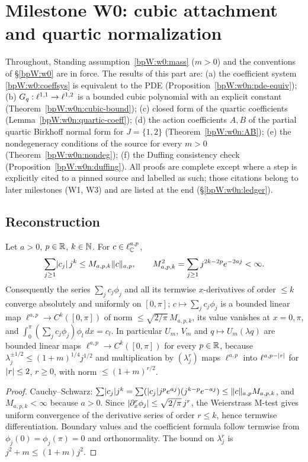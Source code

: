 \section{Milestone W0: cubic attachment and quartic normalization}\label{bpW:w0n}

Throughout, Standing assumption~\ref{bpW:w0:mass} ($m>0$) and the conventions of \S\ref{bpW:w0} are in force. The
results of this part are:
(a) the coefficient system \eqref{bpW:w0:coeffsys} is equivalent to the PDE (Proposition~\ref{bpW:w0n:pde-equiv});
(b) $G_q:\ell^{1,1}\to\ell^{1,2}$ is a bounded cubic polynomial with an explicit constant
(Theorem~\ref{bpW:w0n:cubic-bound});
(c) closed form of the quartic coefficients (Lemma~\ref{bpW:w0n:quartic-coeff});
(d) the action coefficients $A,B$ of the partial quartic Birkhoff normal form for $J=\{1,2\}$
(Theorem~\ref{bpW:w0n:AB});
(e) the nondegeneracy conditions of the source for every $m>0$ (Theorem~\ref{bpW:w0n:nondeg});
(f) the Duffing consistency check (Proposition~\ref{bpW:w0n:duffing}).
All proofs are complete except where a step is explicitly cited to a pinned source and labelled as such; those
citations belong to later milestones (W1, W3) and are listed at the end (\S\ref{bpW:w0n:ledger}).

\subsection{Reconstruction}\label{bpW:w0n:recon}

\begin{lemma}\label{bpW:w0n:recon-bounded}
Let $a>0$, $p\in\mathbb{R}$, $k\in\mathbb{N}$. For $c\in\ell^{a,p}_{\mathbb{C}}$,
\[\sum_{j\ge1}\lvert c_j\rvert\,j^k\le M_{a,p,k}\lVert c\rVert_{a,p},\qquad M_{a,p,k}^2=\sum_{j\ge1}j^{2k-2p}e^{-2aj}<\infty.\]
Consequently the series $\sum_jc_j\phi_j$ and all its termwise $x$-derivatives of order $\le k$ converge absolutely and
uniformly on $[0,\pi]$; $c\mapsto\sum_jc_j\phi_j$ is a bounded linear map $\ell^{a,p}\to C^k([0,\pi])$ of norm
$\le\sqrt{2/\pi}\,M_{a,p,k}$, its value vanishes at $x=0,\pi$, and $\int_0^\pi(\sum_jc_j\phi_j)\phi_l\,dx=c_l$. In
particular $U_m$, $V_m$ and $q\mapsto U_m(\lambda q)$ are bounded linear maps $\ell^{a,p}\to C^k([0,\pi])$ for every
$p\in\mathbb{R}$, because $\lambda_j^{\pm1/2}\le(1+m)^{1/4}j^{1/2}$ and multiplication by $(\lambda_j^r)$ maps $\ell^{a,p}$
into $\ell^{a,p-\lvert r\rvert}$ for $\lvert r\rvert\le 2$, $r\ge0$, with norm $\le(1+m)^{r/2}$.
\end{lemma}

\begin{proof}
Cauchy--Schwarz: $\sum\lvert c_j\rvert j^k=\sum(\lvert c_j\rvert j^pe^{aj})(j^{k-p}e^{-aj})\le\lVert c\rVert_{a,p}M_{a,p,k}$, and
$M_{a,p,k}<\infty$ because $a>0$. Since $\lvert \partial_x^r\phi_j\rvert\le\sqrt{2/\pi}\,j^r$, the Weierstrass M-test gives
uniform convergence of the derivative series of order $r\le k$, hence termwise differentiation. Boundary values and
the coefficient formula follow termwise from $\phi_j(0)=\phi_j(\pi)=0$ and orthonormality. The bound on
$\lambda_j^r$ is $j^2+m\le(1+m)j^2$.
\end{proof}

